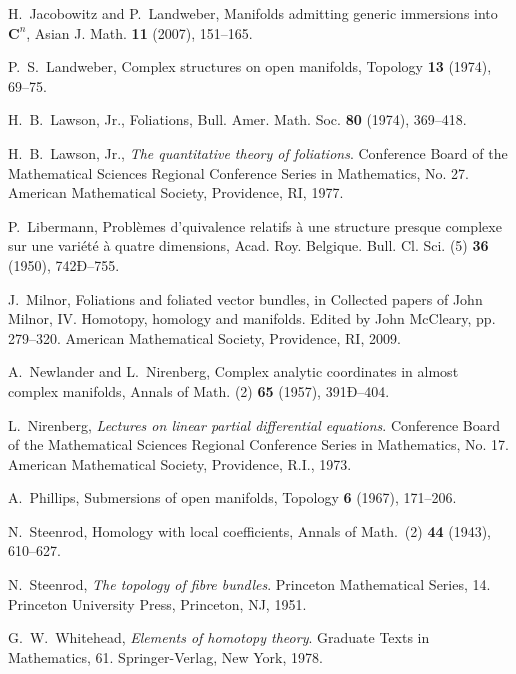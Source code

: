 \documentclass{amsart}
\begin{document}
\begin{thebibliography}{xx}
H.~Jacobowitz and P.~Landweber, 
Manifolds admitting generic immersions into $\mathbf{C}^n$, 
Asian J. Math. \textbf{11} (2007), 151--165. 
 
P.~S.~Landweber, 
Complex structures on open manifolds,
Topology \textbf{13} (1974), 69--75.
  
H.~B.~Lawson, Jr.,
Foliations,
Bull. Amer. Math. Soc. \textbf{80} (1974), 369--418.

H.~B.~Lawson, Jr., 
\textsl{The quantitative theory of foliations}. 
Conference Board of the Mathematical Sciences Regional
Conference Series in Mathematics, No. 27. American Mathematical
Society, Providence, RI, 1977. 

P.~Libermann,
Probl\`emes d'quivalence relatifs \`a une structure presque complexe sur une vari\'et\'e \`a quatre dimensions,  Acad. Roy. Belgique. Bull. Cl. Sci. (5) \textbf{36} (1950), 742Ð--755.

J.~Milnor, 
Foliations and foliated vector bundles, 
in Collected papers of John Milnor, IV.
Homotopy, homology and manifolds.
Edited by John McCleary, pp. 279--320.
American Mathematical Society, Providence, RI, 2009.

A.~Newlander and L.~Nirenberg,
Complex analytic coordinates in almost complex manifolds, 
Annals of Math. (2) \textbf{65} (1957), 391Ð--404.

L.~Nirenberg, 
\textsl{Lectures on linear partial differential equations}.
Conference Board of the Mathematical Sciences Regional Conference Series in Mathematics, No. 17. American Mathematical Society, Providence, R.I., 1973. 

A.~Phillips,
Submersions of open manifolds,
Topology \textbf{6} (1967), 171--206.

N.~Steenrod,
Homology with local coefficients,
Annals of Math.~(2) \textbf{44} (1943), 610--627.

N.~Steenrod,
\textsl{The topology of fibre bundles}. 
Princeton Mathematical Series, 14. Princeton University Press, Princeton, NJ, 1951. 

G.~W.~Whitehead,
\textsl{Elements of homotopy theory}.
Graduate Texts in Mathematics, 61.
Springer-Verlag, New York, 1978.

\end{thebibliography}
\end{document}

